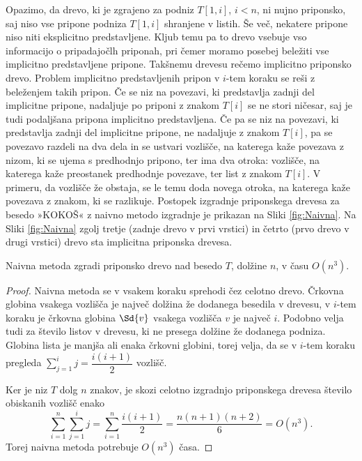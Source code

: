 Opazimo, da drevo, ki  je zgrajeno za podniz $T[1,i]$, $i< n$, ni nujno priponsko, saj niso vse pripone podniza $T[1,i]$ shranjene v listih. Še več, nekatere pripone niso niti eksplicitno predstavljene. Kljub temu pa to drevo vsebuje vso informacijo o pripadajočlh priponah, pri čemer moramo posebej beležiti vse implicitno predstavljene pripone. Takšnemu drevesu rečemo implicitno priponsko drevo. Problem implicitno predstavljenih pripon v $i$-tem koraku se reši z beleženjem takih pripon. Če se niz na povezavi, ki predstavlja zadnji del implicitne pripone, nadaljuje po priponi z znakom $T[i]$ se ne stori ničesar, saj je tudi podaljšana pripona implicitno predstavljena. Če pa se niz na povezavi, ki predstavlja zadnji del implicitne pripone, ne nadaljuje z znakom $T[i]$, pa se povezavo razdeli na dva dela in se ustvari vozlišče, na katerega kaže povezava z nizom, ki se ujema s predhodnjo pripono, ter ima dva otroka: vozlišče, na katerega kaže preostanek predhodnje povezave, ter list z znakom $T[i]$. V primeru, da vozlišče že obstaja, se le temu doda novega otroka, na katerega kaže povezava z znakom, ki se razlikuje. Postopek izgradnje priponskega drevesa za besedo »KOKOŠ« z naivno metodo izgradnje je prikazan na Sliki \ref{fig:Naivna}. Na Sliki \ref{fig:Naivna} zgolj tretje (zadnje drevo v prvi vrstici) in četrto (prvo drevo v drugi vrstici) drevo sta implicitna priponska drevesa.

\begin{izr}\label{izr:naivna}
    Naivna metoda zgradi priponsko drevo nad besedo $T$, dolžine $n$, v času $O(n^3)$.
\end{izr}

\begin{proof}
    Naivna metoda se v vsakem koraku sprehodi čez celotno drevo. Črkovna globina vsakega vozlišča je največ dolžina že dodanega besedila v drevesu, v $i$-tem koraku je črkovna globina $\Sd{v}$ vsakega vozlišča $v$ je največ $i$. Podobno velja tudi za število listov v drevesu, ki ne presega dolžine že dodanega podniza. Globina lista je manjša ali enaka črkovni globini, torej velja, da se v $i$-tem koraku pregleda $\sum_{j=1}^i j=\dfrac{i(i+1)}{2}$ vozlišč.

    Ker je niz $T$ dolg $n$ znakov, je skozi celotno izgradnjo priponskega drevesa število obiskanih vozlišč enako
    $$
        \sum_{i=1}^n \sum_{j=1}^i j=\sum_{i=1}^n \dfrac{i(i+1)}{2}=\dfrac{n(n+1)(n+2)}{6}=O(n^3).
    $$
    Torej naivna metoda potrebuje $O(n^3)$ časa.
\end{proof}


